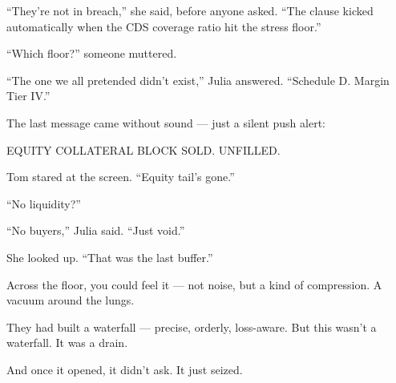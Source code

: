 “They’re not in breach,” she said, before anyone asked. “The clause kicked automatically when the CDS coverage ratio hit the stress floor.”

“Which floor?” someone muttered.

“The one we all pretended didn’t exist,” Julia answered. “Schedule D. Margin Tier IV.”

The last message came without sound — just a silent push alert:

EQUITY COLLATERAL BLOCK SOLD.
UNFILLED.

Tom stared at the screen. “Equity tail’s gone.”

“No liquidity?”

“No buyers,” Julia said. “Just void.”

She looked up. “That was the last buffer.”

Across the floor, you could feel it — not noise, but a kind of compression.
A vacuum around the lungs.

They had built a waterfall — precise, orderly, loss-aware.
But this wasn’t a waterfall.
It was a drain.

And once it opened,
it didn’t ask.
It just seized.

\medskip

